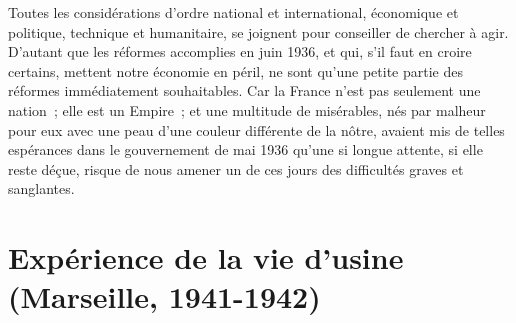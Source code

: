 \documentclass[french,twoside]{book} %
\begin{document}
Toutes les considérations d'ordre national et international, économique et politique, technique et humanitaire, se joignent pour conseiller de chercher à agir. D'autant que les réformes accomplies en juin 1936, et qui, s'il faut en croire certains, mettent notre économie en péril, ne sont qu'une petite partie des réformes immédiatement souhaitables. Car la France n'est pas seulement une nation ; elle est un Empire ; et une multitude de misérables, nés par malheur pour eux avec une peau d'une couleur différente de la nôtre, avaient mis de telles espérances dans le gouvernement de mai 1936 qu'une si longue attente, si elle reste déçue, risque de nous amener un de ces jours des difficultés graves et sanglantes.
\section[Expérience de la vie d'usine  (Marseille, 1941-1942)]{Expérience de la vie d'usine \protect\footnotemark  \\
(Marseille, 1941-1942)}\renewcommand{\leftmark}{Expérience de la vie d'usine  \\
(Marseille, 1941-1942)}
\end{document}

